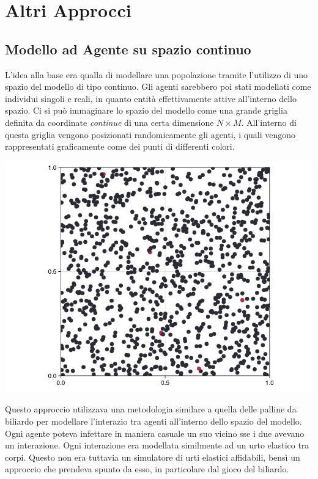 \section{Altri Approcci}

\subsection{Modello ad Agente su spazio continuo}
L'idea alla base era qualla di modellare una popolazione tramite l'utilizzo di 
uno spazio del modello di tipo continuo. Gli agenti sarebbero poi stati modellati come 
individui singoli e reali, in quanto entità effettivamente attive all'interno 
dello spazio. Ci si può immaginare lo spazio del modello come una grande griglia 
definita da coordinate \emph{continue} di una certa dimensione \emph{$N \times M$}. All'interno 
di questa griglia vengono posizionati randomicamente gli agenti, i quali vengono 
rappresentati graficamente come dei punti di differenti colori.

\begin{minipage}{\linewidth}
    \centering
    \includegraphics[width=\textwidth]{img/ball-covid.png}
    \label{fig:ball_covid}
\end{minipage}

Questo approccio utilizzava una metodologia similare a quella delle palline da biliardo 
per modellare l'interazio tra agenti all'interno dello spazio del modello. Ogni agente poteva
infettare in maniera casuale un suo vicino sse i due avevano un interazione. Ogni interazione
era modellata similmente ad un urto elastico tra corpi. 
Questo non era tuttavia un simulatore di urti elastici affidabili, bensì un approccio che prendeva
spunto da esso, in particolare dal gioco del biliardo. 

